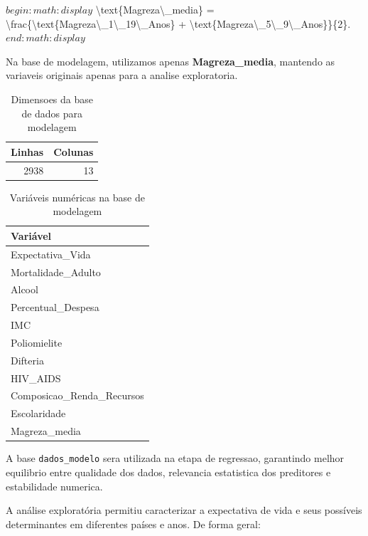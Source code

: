 \documentclass[
  12pt,
]{article}
\begin{document}
\(begin:math:display\)
\textbackslash text\{Magreza\textbackslash\_media\} =
\textbackslash frac\{\textbackslash text\{Magreza\textbackslash\_1\textbackslash\_19\textbackslash\_Anos\}
+
\textbackslash text\{Magreza\textbackslash\_5\textbackslash\_9\textbackslash\_Anos\}\}\{2\}.
\(end:math:display\)

Na base de modelagem, utilizamos apenas \textbf{Magreza\_media},
mantendo as variaveis originais apenas para a analise exploratoria.

\begin{longtable}[t]{rr}
\caption{\label{tab:unnamed-chunk-12}Dimensoes da base de dados para modelagem}\\
\toprule
Linhas & Colunas\\
\midrule
2938 & 13\\
\bottomrule
\end{longtable}

\begin{longtable}[t]{l}
\caption{\label{tab:unnamed-chunk-13}Variáveis numéricas na base de modelagem}\\
\toprule
Variável\\
\midrule
Expectativa\_Vida\\
Mortalidade\_Adulto\\
Alcool\\
Percentual\_Despesa\\
IMC\\
\addlinespace
Poliomielite\\
Difteria\\
HIV\_AIDS\\
Composicao\_Renda\_Recursos\\
Escolaridade\\
\addlinespace
Magreza\_media\\
\bottomrule
\end{longtable}

A base \texttt{dados\_modelo} sera utilizada na etapa de regressao,
garantindo melhor equilibrio entre qualidade dos dados, relevancia
estatistica dos preditores e estabilidade numerica.

A análise exploratória permitiu caracterizar a expectativa de vida e
seus possíveis determinantes em diferentes países e anos. De forma
geral:
\end{document}
